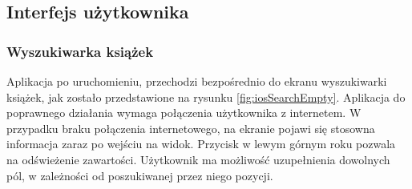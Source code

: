 \documentclass[twoside]{projektInzynierskiMS}
\begin{document}
\subsection{Interfejs użytkownika}


\subsubsection{Wyszukiwarka książek}

Aplikacja po uruchomieniu, przechodzi bezpośrednio do ekranu wyszukiwarki książek, jak zostało przedstawione na rysunku \ref{fig:iosSearchEmpty}. Aplikacja do poprawnego działania wymaga połączenia użytkownika z internetem. W przypadku braku połączenia internetowego, na ekranie pojawi się stosowna informacja zaraz po wejściu na widok. Przycisk w lewym górnym roku pozwala na odświeżenie zawartości. Użytkownik ma możliwość uzupełnienia dowolnych pól, w zależności od poszukiwanej przez niego pozycji. 
\end{document}
